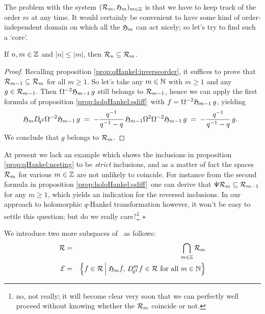 The problem with the system $({\mathcal R}_{m},\mathfrak{H}_{m})_{m\in \mathbb{Z}}$
is that we have to keep track of the order $m$ at any time.
It would certainly be convenient to have some kind of order-independent
domain on which all the $\mathfrak{H}_{m}$ can act nicely;
so let's try to find such a \lq core\rq.



\begin{prop} \label{prop:qHankel:nesting}
If\/ $n,m\in \mathbb{Z}$ and\/ $|n| \leq |m|$, then\/ ${\mathcal R}_{n} \subseteq {\mathcal R}_{m}$.
\end{prop}

\begin{proof}
Recalling proposition \ref{prop:qHankel:inverseorder},
it suffices to prove that ${\mathcal R}_{m-1} \subseteq {\mathcal R}_{m}$ for all $m\geq 1$.
So let's take any $m\in \mathbb{N}$ with $m\geq 1$ and any $g\in {\mathcal R}_{m-1}$.
Then $\Omega^{-2} \mathfrak{H}_{m-1} \,g$ still belongs to ${\mathcal R}_{m-1}$,
hence we can apply the first formula of proposition \ref{prop:holqHankel:qdiff}\
with $f=\Omega^{-2} \mathfrak{H}_{m-1} \, g$, yielding
\begin{equation}\label{eq:qHankel:nesting:proof}
  \mathfrak{H}_{m} D_{\!q^2} \Omega^{-2} \mathfrak{H}_{m-1}\, g
      \;=\; -\frac{q^{-1}}{q^{-1}-q} \,\mathfrak{H}_{m-1} \Omega^2 \Omega^{-2} \mathfrak{H}_{m-1}\,g
      \;=\; -\frac{q^{-1}}{q^{-1}-q} \, g.
      \;\;
\end{equation}
We conclude that $g$ belongs to ${\mathcal R}_{m}$.
\end{proof}



\begin{remark} \label{rem:Q:strict_inclusions} \rm
At present we lack an example which shows the inclusions in
proposition \ref{prop:qHankel:nesting} to be {\em strict\/} inclusions,
and as a matter of fact the spaces ${\mathcal R}_{m}$ for various $m\in\mathbb{Z}$ are not unlikely
to coincide. For instance from the second formula in proposition
\ref{prop:holqHankel:qdiff}\ one can derive that
$\Psi {\mathcal R}_{m} \subseteq {\mathcal R}_{m-1}$ for any $m\geq 1$, which yields an indication
for the reversed inclusions. In our approach to holomorphic $q$-Hankel transformation
however, it won't be easy to settle this question; but do we really
care?\footnote{no, not really; it will become clear very soon that we can perfectly
well proceed without knowing whether the ${\mathcal R}_{m}$ coincide or not. }
$\hfill \star$
\end{remark}



\begin{defn*} \label{def:Hcore}
We introduce two more subspaces of \HC\ as follows:
\begin{eqnarray*}
  \Hintersect &=& \bigcap_{m\in\ZZ} \holS{m}  \\
  \Hcore      &=& \left\{ f \in \Hintersect \left| \vertL \right.
                  \holH{m}f, \, \Dqsqr^m f \in \Hintersect
                  \mbox{ for all } m\in \NN  \right\} \\
\end{eqnarray*}
\end{defn*}



